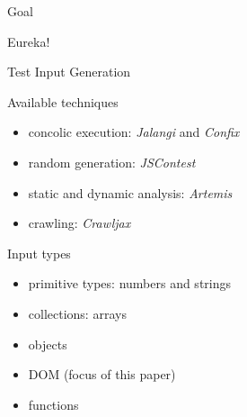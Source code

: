 \documentclass{beamer}
\begin{document}
\begin{frame}{Goal}
\end{frame}

\begin{frame}{Eureka!}
\end{frame}

\begin{frame}{Test Input Generation}
  \begin{block}{Available techniques}
    \begin{itemize}
    \item concolic execution: \emph{Jalangi} and \emph{Confix}
    \item random generation: \emph{JSContest}
    \item static and dynamic analysis: \emph{Artemis}
    \item crawling: \emph{Crawljax}   
  \end{itemize}
  \end{block}
  
  \begin{block}{Input types}
    \begin{itemize}
      \item primitive types: numbers and strings
      \item collections: arrays
      \item objects
      \item DOM (focus of this paper)
      \item functions  
    \end{itemize}
  \end{block}
\end{frame}
\end{document}
